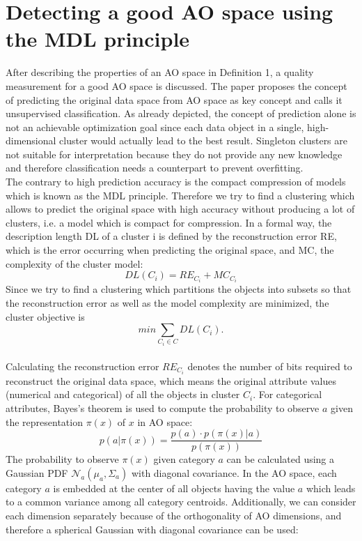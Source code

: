 \documentclass[conference]{IEEEtran}
\begin{document}
\section{Detecting a good AO space using the MDL principle}
After describing the properties of an AO space in Definition 1\cite{scenic}, a quality measurement for a good AO space is discussed. The paper proposes the concept of predicting the original data space from AO space as key concept and calls it unsupervised classification. As already depicted, the concept of prediction alone is not an achievable optimization goal since each data object in a single, high-dimensional cluster would actually lead to the best result. Singleton clusters are not suitable for interpretation because they do not provide any new knowledge and therefore classification needs a counterpart to prevent overfitting. 
\\
The contrary to high prediction accuracy is the compact compression of models which is known as the MDL principle. Therefore we try to find a clustering which allows to predict the original space with high accuracy without producing a lot of clusters, i.e. a model which is compact for compression. In a formal way, the description length DL of a cluster i is defined by the reconstruction error RE, which is the error occurring when predicting the original space, and MC, the complexity of the cluster model:
\begin{equation*}
DL(C_i) = RE_{C_i} + MC_{C_i}
\end{equation*}
Since we try to find a clustering which partitions the objects into subsets so that the reconstruction error as well as the model complexity are minimized, the cluster objective is
\begin{equation*}
min \sum_{C_i \in C} {DL(C_i)}.
\end{equation*}
\\
Calculating the reconstruction error $RE_{C_i}$ denotes the number of bits required to reconstruct the original data space, which means the original attribute values (numerical and categorical) of all the objects in cluster $C_i$. 
For categorical attributes, Bayes's theorem is used to compute the probability to observe $a$ given the representation $\pi(x)$ of $x$ in AO space:
\begin{equation*}
p(a|\pi(x)) =  \frac{p(a) \cdot p(\pi(x)|a)}{p(\pi(x))}
\end{equation*}
The probability to observe $\pi(x)$ given category $a$ can be calculated using a Gaussian PDF $\mathcal{N}_a(\mu_a, \Sigma_a)$ with diagonal covariance. In the AO space, each category $a$ is embedded at the center of all objects having the value $a$ which leads to a common variance among all category centroids. Additionally, we can consider each dimension separately because of the orthogonality of AO dimensions, and therefore a spherical Gaussian with diagonal covariance can be used:
\end{document}
